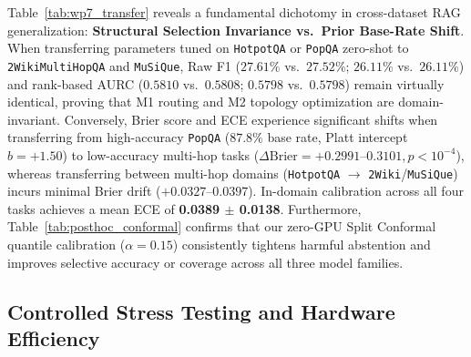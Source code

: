 \documentclass[11pt]{article}
\begin{document}
Table~\ref{tab:wp7_transfer} reveals a fundamental dichotomy in cross-dataset RAG generalization:
\textbf{Structural Selection Invariance vs.\ Prior Base-Rate Shift}. When transferring parameters tuned on \texttt{HotpotQA} or \texttt{PopQA} zero-shot to \texttt{2WikiMultiHopQA} and \texttt{MuSiQue}, Raw F1 ($27.61\%$ vs.\ $27.52\%$; $26.11\%$ vs.\ $26.11\%$) and rank-based AURC ($0.5810$ vs.\ $0.5808$; $0.5798$ vs.\ $0.5798$) remain virtually identical, proving that M1 routing and M2 topology optimization are domain-invariant. Conversely, Brier score and ECE experience significant shifts when transferring from high-accuracy \texttt{PopQA} ($87.8\%$ base rate, Platt intercept $b=+1.50$) to low-accuracy multi-hop tasks ($\Delta\text{Brier} = +0.2991\text{--}0.3101, p < 10^{-4}$), whereas transferring between multi-hop domains (\texttt{HotpotQA} $\to$ \texttt{2Wiki}/\texttt{MuSiQue}) incurs minimal Brier drift ($+0.0327\text{--}0.0397$). In-domain calibration across all four tasks achieves a mean ECE of \textbf{0.0389 $\pm$ 0.0138}. Furthermore, Table~\ref{tab:posthoc_conformal} confirms that our zero-GPU Split Conformal quantile calibration ($\alpha=0.15$) consistently tightens harmful abstention and improves selective accuracy or coverage across all three model families.

\subsection{Controlled Stress Testing and Hardware Efficiency}
\end{document}
